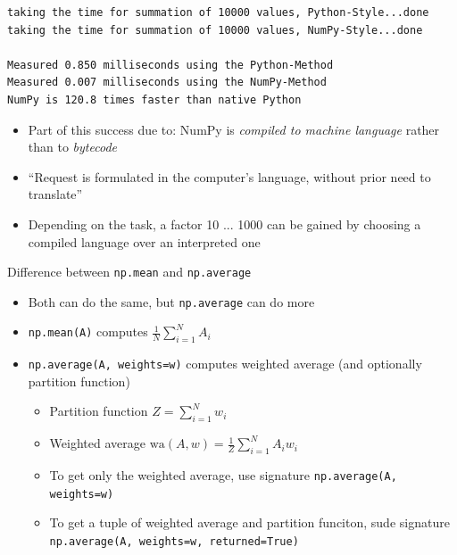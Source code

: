
\begin{frame}[fragile]
%
\vspace{-3pt}
\begin{cmdbox}
\begin{verbatim}
taking the time for summation of 10000 values, Python-Style...done
taking the time for summation of 10000 values, NumPy-Style...done

Measured 0.850 milliseconds using the Python-Method
Measured 0.007 milliseconds using the NumPy-Method
NumPy is 120.8 times faster than native Python
\end{verbatim}
\end{cmdbox}
%
\begin{itemize}
\item Part of this success due to: NumPy is \emph{compiled to machine language} rather than to \emph{bytecode}
\item \enquote{Request is formulated in the computer's language, without prior need to translate}
\item Depending on the task, a factor 10 ... 1000 can be gained by choosing a compiled language over an interpreted one
\end{itemize}
%
\end{frame}


\begin{frame}[fragile]{Difference between \texttt{np.mean} and \texttt{np.average}}
%
\begin{itemize}
\item Both can do the same, but \texttt{np.average} can do more
\item \texttt{np.mean(A)} computes $\frac{1}{N} \sum_{i=1}^{N} A_i$
\item \texttt{np.average(A, weights=w)} computes weighted average (and optionally partition function)
	\begin{itemize}
	\item Partition function $Z = \sum_{i=1}^{N} w_i$
	\item Weighted average $\text{wa}(A, w) = \frac{1}{Z} \sum_{i=1}^{N} A_i w_i$
	\item To get only the weighted average, use signature \texttt{np.average(A, weights=w)}
	\item To get a tuple of weighted average and partition funciton, sude signature \texttt{np.average(A, weights=w, returned=True)}
	\end{itemize}
\end{itemize}
%
\end{frame}

